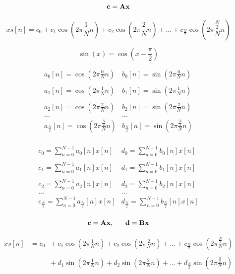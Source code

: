 \documentclass{article}[12pt]
\newcommand{\Dfrac}[2]{\frac{\displaystyle #1}{\displaystyle #2}}
\newcommand{\D}{\displaystyle}
\begin{document}
$${\bf c} = {\bf A} {\bf x}$$

$$xs[n]  = c_0 +  c_1 \cos (2 \pi \frac{1}{N} n) + c_2 \cos (2 \pi
\frac{2}{N} n) + \ldots + c_{\frac{N}{2}}\cos (2 \pi
\frac{\frac{N}{2}}{N} n)$$

$$\sin(x) = \cos(x - \frac{\pi}{2})$$

$$\begin{array}{ll}
a_0[n] = \cos (2 \pi \Dfrac{0}{N} n)  & b_0[n] = \sin (2 \pi \Dfrac{0}{N} n)\\
&\\
a_1[n] = \cos (2 \pi \Dfrac{1}{N} n)  & b_1[n] = \sin (2 \pi \Dfrac{1}{N} n)\\
&\\
a_2[n] = \cos (2 \pi \Dfrac{2}{N} n)  & b_2[n] = \sin (2 \pi \Dfrac{2}{N} n)\\
\ldots        & \ldots \\
a_{\frac{N}{2}}[n] = \cos (2 \pi \frac{\frac{N}{2}}{N} n) & b_{\frac{N}{2}}[n] = \sin (2 \pi \frac{\frac{N}{2}}{N} n)
 \\
\end{array} $$ 

$$\begin{array}{ll} 
c_0 = \D\sum_{n=0}^{N-1} a_0[n] x[n]&d_0 = \D\sum_{n=0}^{N-1} b_0[n] x[n] \\
&\\
c_1 = \D\sum_{n=0}^{N-1} a_1[n] x[n]&d_1 = \D\sum_{n=0}^{N-1} b_1[n] x[n] \\
&\\
c_2 = \D\sum_{n=0}^{N-1} a_2[n] x[n]&d_2 = \D\sum_{n=0}^{N-1} b_2[n] x[n] \\
\ldots&\ldots\\
c_{\frac{N}{2}} = \D\sum_{n=0}^{N-1} a_{\frac{N}{2}}[n] x[n] & 
d_{\frac{N}{2}} = \D\sum_{n=0}^{N-1} b_{\frac{N}{2}}[n] x[n] \\
\end{array} $$ 

$${\bf c} = {\bf A} {\bf x}, ~~~~~{\bf d} = {\bf B} {\bf x}$$

$$\begin{array}{lcl}
xs[n] & = c_0 & + ~ c_1 \cos (2 \pi \D\frac{1}{N} n) + c_2 \cos (2 \pi
\D\frac{2}{N} n) + \ldots + c_{\frac{N}{2}}\cos (2 \pi
\D\frac{\frac{N}{2}}{N} n)\\
&\\
  &&+ ~ d_1 \sin (2 \pi \D\frac{1}{N} n) + d_2 \sin (2 \pi
\D\frac{2}{N} n) + \ldots + d_{\frac{N}{2}}\sin (2 \pi
\D\frac{\frac{N}{2}}{N} n) \\
\end{array}$$
\end{document}
